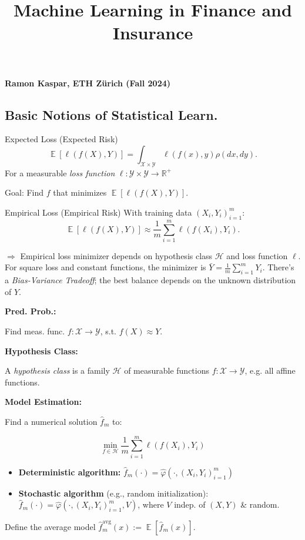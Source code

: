 \documentclass[a4paper,10pt]{article}
\title{\textbf{Machine Learning in Finance and Insurance}}
\author{}
\date{}
\newenvironment{myitemize}
{\vspace{-0.25cm}\begin{itemize}}
{\end{itemize}}
\def\R{\mathbb{R}}
\DeclareMathOperator{\E}{\mathbb{E}}
\newcommand{\subtitle}[1]{\begin{normalsize}\vspace{0.25cm}\textbf{#1} \end{normalsize}}
\begin{document}
\maketitle

\vspace{-3cm}


\begin{center}
    \textbf{Ramon Kaspar, ETH Zürich (Fall 2024)}
\end{center}

\begin{small}

\section{Basic Notions of Statistical Learn.}

\begin{subbox}{Expected Loss (Expected Risk)}
\[
\E[\ell(f(X), Y)] = \int_{\mathcal{X} \times \mathcal{Y}} \ell(f(x), y) \rho(dx, dy).
\]
For a measurable \textit{loss function} \(\ell : \mathcal{Y} \times \mathcal{Y} \to \R^+\)
\end{subbox}
Goal: Find \(f\) that minimizes \(\E[\ell(f(X), Y)]\).

\begin{subbox}{Empirical Loss (Empirical Risk)}
    With training data $(X_i, Y_i)_{i=1}^m$: 
    \[
        \E[\ell(f(X), Y)] \approx \frac{1}{m} \sum_{i=1}^m \ell(f(X_i), Y_i).
    \]
\end{subbox}
\(\Rightarrow\) Empirical loss minimizer depends on hypothesis class \(\mathcal{H}\) and loss function \(\ell\). For square loss and constant functions, the minimizer is \(\bar{Y} = \frac{1}{m} \sum_{i=1}^{m} Y_i\). There's a \textit{Bias-Variance Tradeoff}; the best balance depends on the unknown distribution of \(Y\).

\subtitle{Pred. Prob.:} 
Find meas. func. \(f: \mathcal{X} \rightarrow \mathcal{Y}\), s.t. \(f(X) \approx Y\).

\subtitle{Hypothesis Class:} 
A \textit{hypothesis class} is a family \(\mathcal{H}\) of measurable functions \(f : \mathcal{X} \to \mathcal{Y}\), e.g. all affine functions.

\subtitle{Model Estimation:}
Find a numerical solution \(\hat{f}_m\) to:
\begin{footnotesize}  
\[
\min_{f \in \mathcal{H}} \frac{1}{m} \sum_{i=1}^m \ell(f(X_i), Y_i)
\]
\end{footnotesize}
\begin{myitemize}
    \item \textbf{Deterministic algorithm:} \(\hat{f}_m(\cdot) = \hat{\varphi}\left( \cdot , (X_i, Y_i)_{i=1}^m \right)\)
    \item \textbf{Stochastic algorithm} (e.g., random initialization): \(\hat{f}_m(\cdot) = \hat{\varphi}\left( \cdot , (X_i, Y_i)_{i=1}^m, V \right)\), where \(V\) indep. of \((X, Y)\) \& random.
\end{myitemize}
Define the average model \(\hat{f}_m^{\text{avg}}(x) := \E[\hat{f}_m(x)]\).


\end{small}
\end{document}
